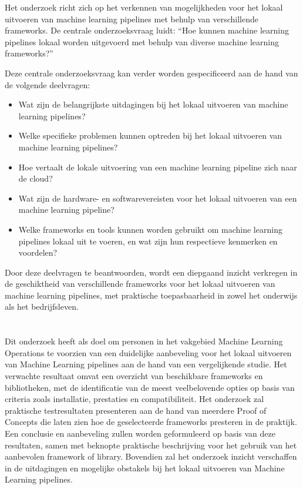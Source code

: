 Het onderzoek richt zich op het verkennen van mogelijkheden voor het lokaal uitvoeren van machine learning pipelines met behulp van verschillende frameworks. De centrale onderzoeksvraag luidt: ``Hoe kunnen machine learning pipelines lokaal worden uitgevoerd met behulp van diverse machine learning frameworks?''

Deze centrale onderzoeksvraag kan verder worden gespecificeerd aan de hand van de volgende deelvragen:
\begin{itemize}
  \item Wat zijn de belangrijkste uitdagingen bij het lokaal uitvoeren van machine learning pipelines?
  \item Welke specifieke problemen kunnen optreden bij het lokaal uitvoeren van machine learning pipelines?
  \item Hoe vertaalt de lokale uitvoering van een machine learning pipeline zich naar de cloud?
  \item Wat zijn de hardware- en softwarevereisten voor het lokaal uitvoeren van een machine learning pipeline?
  \item Welke frameworks en tools kunnen worden gebruikt om machine learning pipelines lokaal uit te voeren, en wat zijn hun respectieve kenmerken en voordelen?
\end{itemize}

Door deze deelvragen te beantwoorden, wordt een diepgaand inzicht verkregen in de geschiktheid van verschillende frameworks voor het lokaal uitvoeren van machine learning pipelines, met praktische toepasbaarheid in zowel het onderwijs als het bedrijfsleven.

\section{}%
\label{sec:onderzoeksdoelstelling}

Dit onderzoek heeft als doel om personen in het vakgebied Machine Learning Operations te voorzien van een duidelijke aanbeveling voor het lokaal uitvoeren van
Machine Learning pipelines aan de hand van een vergelijkende studie. 
Het verwachte resultaat omvat een overzicht van beschikbare frameworks en bibliotheken, met de identificatie van de meest veelbelovende opties op basis van criteria zoals installatie, prestaties en compatibiliteit.
Het onderzoek zal praktische testresultaten presenteren aan de hand van meerdere Proof of Concepts die laten zien hoe de geselecteerde frameworks presteren in de praktijk. 
Een conclusie en aanbeveling zullen worden geformuleerd op basis van deze resultaten, samen met beknopte praktische beschrijving voor het gebruik van het aanbevolen framework of library.
Bovendien zal het onderzoek inzicht verschaffen in de uitdagingen en mogelijke obstakels bij het lokaal uitvoeren van Machine Learning pipelines.


